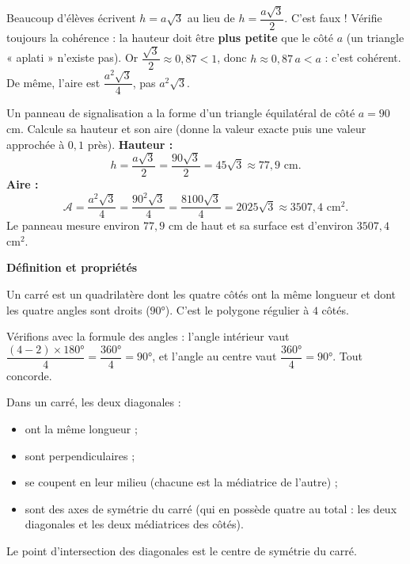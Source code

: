 \documentclass[11pt]{article}
\newcommand{\cle}[1]{{\popxbold\color{popdark}#1}}
\newcounter{popsec}
\newcounter{popsub}
\newcommand{\courssub}[1]{%
  \stepcounter{popsub}%
  \par\vspace{9pt}\noindent{\popxbold\fontsize{11.5}{13}\selectfont\color{popink}{\color{poporange}\thepopsec.\thepopsub}\hspace{6pt}#1}\par\nopagebreak\vspace{4pt}
}
\begin{document}
\begin{attention}
Beaucoup d'élèves écrivent $h = a\sqrt{3}$ au lieu de $h = \dfrac{a\sqrt{3}}{2}$. C'est faux ! Vérifie toujours la cohérence : la hauteur doit être \textbf{plus petite} que le côté $a$ (un triangle « aplati » n'existe pas). Or $\dfrac{\sqrt{3}}{2} \approx 0,87 < 1$, donc $h \approx 0,87\,a < a$ : c'est cohérent. De même, l'aire est $\dfrac{a^2\sqrt{3}}{4}$, pas $a^2\sqrt{3}$.
\end{attention}

\begin{exoresolu}
Un panneau de signalisation a la forme d'un triangle équilatéral de côté $a = 90$ cm. Calcule sa hauteur et son aire (donne la valeur exacte puis une valeur approchée à $0,1$ près).
\tcblower
\textbf{Hauteur :}
\[ h = \frac{a\sqrt{3}}{2} = \frac{90\sqrt{3}}{2} = 45\sqrt{3} \approx 77,9 \text{ cm}. \]
\textbf{Aire :}
\[ \mathcal{A} = \frac{a^2\sqrt{3}}{4} = \frac{90^2\sqrt{3}}{4} = \frac{8100\sqrt{3}}{4} = 2025\sqrt{3} \approx 3507,4 \text{ cm}^2. \]
Le panneau mesure environ $77,9$ cm de haut et sa surface est d'environ $3507,4$ cm$^2$.
\end{exoresolu}

\courssub{Le carré}

\textbf{Définition et propriétés}

\begin{definition}[Carré]
Un \cle{carré} est un quadrilatère dont les quatre côtés ont la même longueur et dont les quatre angles sont droits ($90°$). C'est le polygone régulier à $4$ côtés.
\end{definition}

Vérifions avec la formule des angles : l'angle intérieur vaut $\dfrac{(4-2)\times 180°}{4} = \dfrac{360°}{4} = 90°$, et l'angle au centre vaut $\dfrac{360°}{4} = 90°$. Tout concorde.

\begin{propriete}
Dans un carré, les deux diagonales :
\begin{itemize}
\item ont la \cle{même longueur} ;
\item sont \cle{perpendiculaires} ;
\item se coupent en leur \cle{milieu} (chacune est la médiatrice de l'autre) ;
\item sont des axes de symétrie du carré (qui en possède quatre au total : les deux diagonales et les deux médiatrices des côtés).
\end{itemize}
Le point d'intersection des diagonales est le \cle{centre de symétrie} du carré.
\end{propriete}
\end{document}
